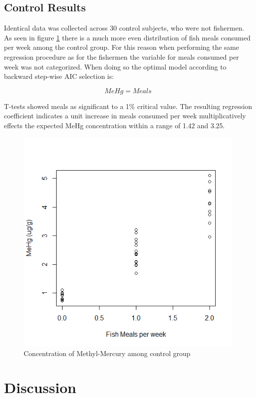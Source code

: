\documentclass[twocolumn, 12pt]{report}
\begin{document}
\subsection{Control Results}

Identical data was collected across 30 control subjects, who were not fishermen. As seen in figure \ref{fig:control} there is a much more even distribution of fish meals consumed per week among the control group. For this reason when performing the same regression procedure as for the fishermen the variable for meals consumed per week was not categorized. When doing so the optimal model according to backward step-wise AIC selection is:

\[MeHg = Meals\]

T-tests showed meals as significant to a 1\% critical value. The resulting regression coefficient indicates a unit increase in meals consumed per week multiplicatively effects the expected MeHg concentration within a range of 1.42 and 3.25. 

\begin{figure}
	\includegraphics[width=\linewidth]{res/control_meals.png}
	\caption{Concentration of Methyl-Mercury among control group}
	\label{fig:control}
\end{figure}
   
\section{Discussion}
\end{document}
